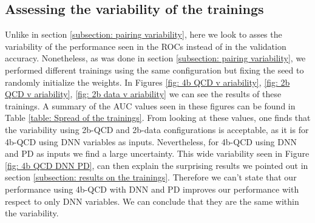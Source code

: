 \clearpage

\subsection{Assessing the variability of the trainings} \label{subsection: var of training S/B}

Unlike in section \ref{subsection: pairing variability}, here we look to asses the variability of the performance seen in the ROCs instead of in the validation accuracy. Nonetheless, as was done in section \ref{subsection: pairing variability}, we performed different trainings using the same configuration but fixing the seed to randomly initialize the weights. In Figures \ref{fig: 4b QCD v ariability}, \ref{fig: 2b QCD v ariability}, \ref{fig: 2b data v ariability} we can see the results of these trainings. A summary of the AUC values seen in these figures can be found in Table \ref{table: Spread of the trainings}. From looking at these values, one finds that the variability using 2b-QCD and 2b-data configurations is acceptable, as it is for 4b-QCD using DNN variables as inputs. Nevertheless, for 4b-QCD using DNN and PD as inputs we find a large uncertainty. This wide variability seen in Figure \ref{fig: 4b QCD DNN PD}, can then explain the surprising results we pointed out in section \ref{subsection: results on the trainings}. Therefore we can't state that our performance using 4b-QCD with DNN and PD improves our performance with respect to only DNN variables. We can conclude that they are the same within the variability. 


